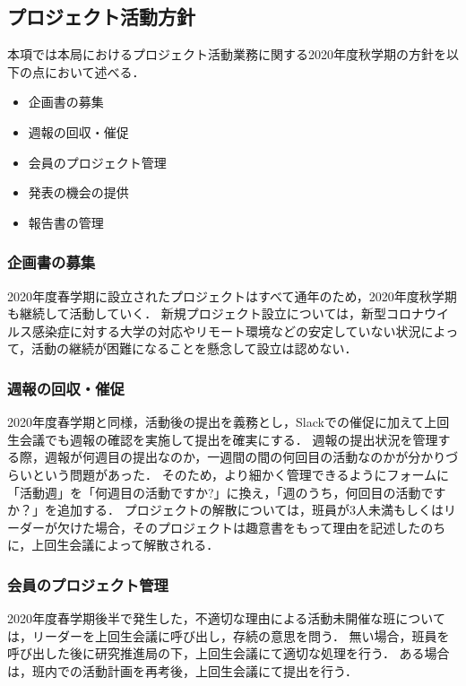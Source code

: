 \subsection*{プロジェクト活動方針}


本項では本局におけるプロジェクト活動業務に関する2020年度秋学期の方針を以下の点において述べる．

\begin{itemize}
\item 企画書の募集
\item 週報の回収・催促
\item 会員のプロジェクト管理
\item 発表の機会の提供
\item 報告書の管理
\end{itemize}

\subsubsection*{企画書の募集}

2020年度春学期に設立されたプロジェクトはすべて通年のため，2020年度秋学期も継続して活動していく．
新規プロジェクト設立については，新型コロナウイルス感染症に対する大学の対応やリモート環境などの安定していない状況によって，活動の継続が困難になることを懸念して設立は認めない．

\subsubsection*{週報の回収・催促}

2020年度春学期と同様，活動後の提出を義務とし，Slackでの催促に加えて上回生会議でも週報の確認を実施して提出を確実にする．
週報の提出状況を管理する際，週報が何週目の提出なのか，一週間の間の何回目の活動なのかが分かりづらいという問題があった．
そのため，より細かく管理できるようにフォームに「活動週」を「何週目の活動ですか?」に換え，「週のうち，何回目の活動ですか？」を追加する．
プロジェクトの解散については，班員が3人未満もしくはリーダーが欠けた場合，そのプロジェクトは趣意書をもって理由を記述したのちに，上回生会議によって解散される．

\subsubsection*{会員のプロジェクト管理}

2020年度春学期後半で発生した，不適切な理由による活動未開催な班については，リーダーを上回生会議に呼び出し，存続の意思を問う．
無い場合，班員を呼び出した後に研究推進局の下，上回生会議にて適切な処理を行う．
ある場合は，班内での活動計画を再考後，上回生会議にて提出を行う．

